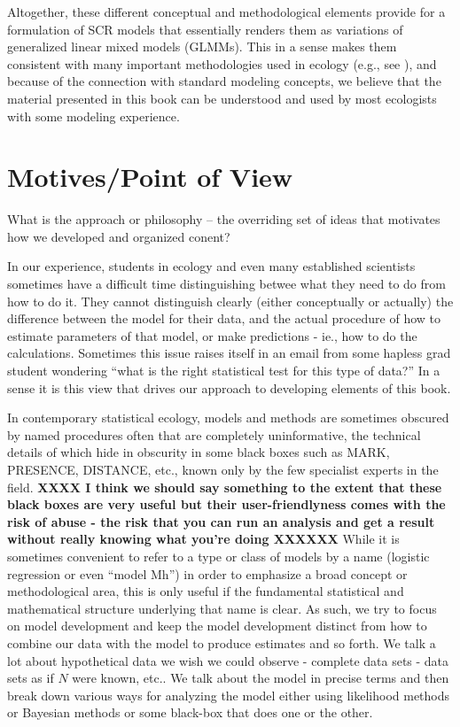 Altogether, these different conceptual and methodological elements
provide for a formulation of SCR models that essentially renders them
as variations of generalized linear mixed models (GLMMs). This in a
sense makes them consistent with many important methodologies used in
ecology (e.g., see \citet{zuur_etal:2009, kery_etal:2010}), and
because of the connection with standard modeling concepts, we believe
that the material presented in this book can be understood and used by
most ecologists with some modeling experience.



\section*{Motives/Point of View}

What is the approach or philosophy -- the overriding set of ideas that
motivates how we developed and organized conent?

In our experience, students in ecology
and even many established scientists sometimes have a difficult time
distinguishing betwee what they need to do from how to do it.  They
cannot distinguish clearly (either conceptually or actually) the
difference between the model for their data, and the actual procedure
of how to estimate parameters of that model, or make predictions -
ie., how to do the calculations. Sometimes this issue raises itself in
an email from some hapless grad student wondering ``what is the right
statistical test for this type of data?''  In a sense it is this view
that drives our approach to developing elements of this book.

In contemporary statistical ecology, models and methods are sometimes
obscured by named procedures often that are completely uninformative,
the technical details of which hide in obscurity in some black boxes
such as MARK, PRESENCE, DISTANCE, etc., known only by the few
specialist experts in the field.  {\bf XXXX I think we should say
  something to the extent that these black boxes are very useful but
  their user-friendlyness comes with the risk of abuse - the risk that
  you can run an analysis and get a result without really knowing what
  you're doing XXXXXX}  While it is sometimes convenient to refer to a
type or class of models by a name (logistic regression or even ``model
Mh'') in order to emphasize a broad concept or methodological area,
this is only useful if the fundamental statistical and mathematical
structure underlying that name is clear. As such, we try to focus on
model development and keep the model development distinct from how to
combine our data with the model to produce estimates and so forth. We
talk a lot about hypothetical data we wish we could observe - complete
data sets - data sets as if $N$ were known, etc.. We talk about the
model in precise terms and then break down various ways for analyzing
the model either using likelihood methods or Bayesian methods or some
black-box that does one or the other.




